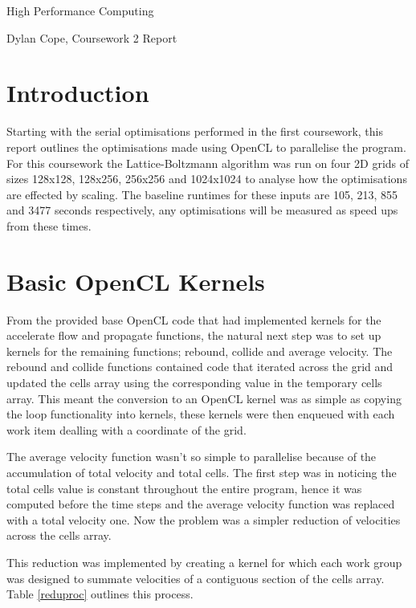 \documentclass[12pt, a4paper]{article}
\begin{document}
  \vspace{.1in}
	\begin{center}
	{ \Large High Performance Computing }

  \end{center}
  \begin{center}

	Dylan Cope, Coursework 2 Report

	\vspace{.1in}

	\end{center}

  \section*{Introduction}

  Starting with the serial optimisations performed in the first coursework, this report outlines the optimisations made using OpenCL to parallelise the program. For this coursework the Lattice-Boltzmann algorithm was run on four 2D grids of sizes 128x128, 128x256, 256x256 and 1024x1024 to analyse how the optimisations are effected by scaling. The baseline runtimes for these inputs are 105, 213, 855 and 3477 seconds respectively, any optimisations will be measured as speed ups from these times.

  \section*{Basic OpenCL Kernels}

  \begin{multicols}{2}

    From the provided base OpenCL code that had implemented kernels for the accelerate flow and propagate functions, the natural next step was to set up kernels for the remaining functions; rebound, collide and average velocity. The rebound and collide functions contained code that iterated across the grid and updated the cells array using the corresponding value in the temporary cells array. This meant the conversion to an OpenCL kernel was as simple as copying the loop functionality into kernels, these kernels were then enqueued with each work item dealling with a coordinate of the grid.

    The average velocity function wasn't so simple to parallelise because of the accumulation of total velocity and total cells. The first step was in noticing the total cells value is constant throughout the entire program, hence it was computed before the time steps and the average velocity function was replaced with a total velocity one. Now the problem was a simpler reduction of velocities across the cells array.

    This reduction was implemented by creating a kernel for which each work group was designed to summate velocities of a contiguous section of the cells array. Table \ref{reduproc} outlines this process.
  \end{multicols}
\end{document}
